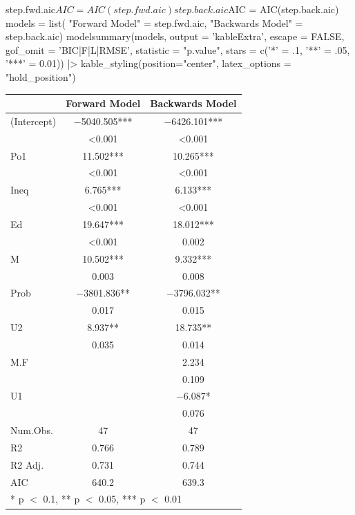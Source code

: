 \documentclass[a4paper]{article}
\begin{document}
\begin{Schunk}
\begin{Sinput}
step.fwd.aic$AIC = AIC(step.fwd.aic)
step.back.aic$AIC = AIC(step.back.aic)
models = list(
	"Forward Model" = step.fwd.aic,
	"Backwards Model" = step.back.aic)
modelsummary(models, output = 'kableExtra', escape = FALSE, gof_omit = 'BIC|F|L|RMSE', statistic = "{p.value}", stars = c('*' = .1, '**' = .05, '***' = 0.01)) |>
  kable_styling(position="center", latex_options = "hold_position")
\end{Sinput}
\begin{table}[!h]
\centering
\begin{tabular}[t]{lcc}
\toprule
  & Forward Model & Backwards Model\\
\midrule
(Intercept) & \num{-5040.505}*** & \num{-6426.101}***\\
 & \num{<0.001} & \vphantom{2} \num{<0.001}\\
Po1 & \num{11.502}*** & \num{10.265}***\\
 & \num{<0.001} & \vphantom{1} \num{<0.001}\\
Ineq & \num{6.765}*** & \num{6.133}***\\
 & \num{<0.001} & \num{<0.001}\\
Ed & \num{19.647}*** & \num{18.012}***\\
 & \num{<0.001} & \num{0.002}\\
M & \num{10.502}*** & \num{9.332}***\\
 & \num{0.003} & \num{0.008}\\
Prob & \num{-3801.836}** & \num{-3796.032}**\\
 & \num{0.017} & \num{0.015}\\
U2 & \num{8.937}** & \num{18.735}**\\
 & \num{0.035} & \num{0.014}\\
M.F &  & \num{2.234}\\
 &  & \num{0.109}\\
U1 &  & \num{-6.087}*\\
 &  & \num{0.076}\\
\midrule
Num.Obs. & \num{47} & \num{47}\\
R2 & \num{0.766} & \num{0.789}\\
R2 Adj. & \num{0.731} & \num{0.744}\\
AIC & \num{640.2} & \num{639.3}\\
\bottomrule
\multicolumn{3}{l}{\rule{0pt}{1em}* p $<$ 0.1, ** p $<$ 0.05, *** p $<$ 0.01}\\
\end{tabular}
\end{table}

\end{Schunk}
\end{document}
